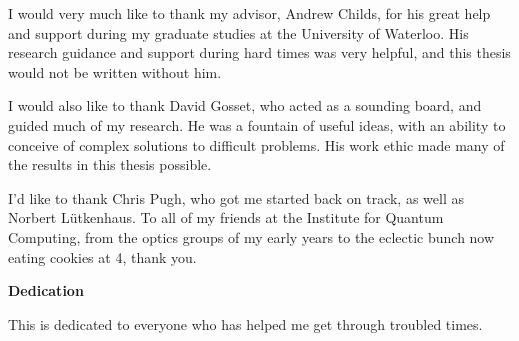 I would very much like to thank my advisor, Andrew Childs, for his great help and support during my graduate studies at the University of Waterloo.  His research guidance and support during hard times was very helpful, and this thesis would not be written without him.

I would also like to thank David Gosset, who acted as a sounding board, and guided much of my research.  He was a fountain of useful ideas, with an ability to conceive of complex solutions to difficult problems.  His work ethic made many of the results in this thesis possible.

I'd like to thank Chris Pugh, who got me started back on track, as well as Norbert L\"{u}tkenhaus.  To all of my friends at the Institute for Quantum Computing, from the optics groups of my early years to the eclectic bunch now eating cookies at 4, thank you.
\cleardoublepage


\begin{center}\textbf{Dedication}\end{center}

This is dedicated to everyone who has helped me get through troubled times.
\cleardoublepage


\renewcommand\contentsname{Table of Contents}
\tableofcontents
\cleardoublepage
{}




\listoffigures
\cleardoublepage
{}		%





